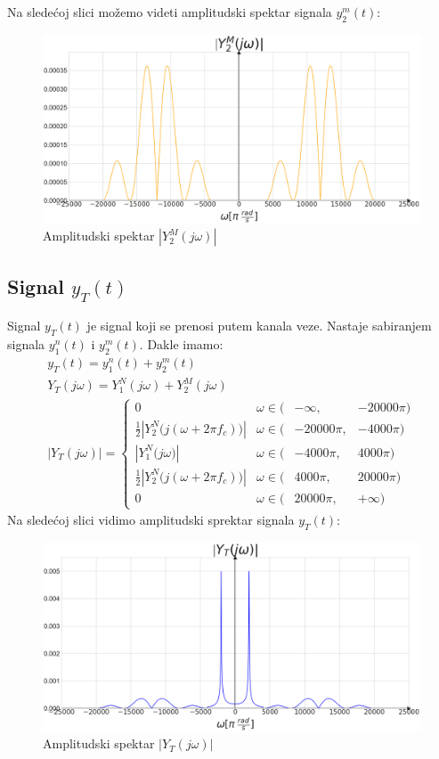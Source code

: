 \documentclass[titlepage,a4paper,12pt]{article}
\begin{document}
	\clearpage
	Na sledećoj slici možemo videti amplitudski spektar signala $y_2^m(t)$:
	\begin{figure}[ht]
		\centering
		\includegraphics[width=\textwidth]{Images/AmpY2M.png}
		\caption{Amplitudski spektar $|Y_2^M(j\omega)|$}\label{fig:AmpY2M}
	\end{figure}
	\FloatBarrier
	\clearpage
	
	\subsection{Signal $y_T(t)$}
	Signal $y_T(t)$ je signal koji se prenosi putem kanala veze. Nastaje sabiranjem signala $y_1^n(t)$ i $y_2^m(t)$. Dakle imamo:
	\begin{gather}
		y_T(t) = y_1^n(t) + y_2^m(t)\\
		Y_T(j\omega) = Y_1^N(j\omega) + Y_2^M(j\omega)\\
		|Y_T(j\omega)| = \left\{
		\begin{array}{rlrrl}
			0& \omega \in (&-\infty,& -20000\pi) \\
			\frac{1}{2}|Y_2^N\big(j(\omega+2\pi f_c)\big)|& \omega \in (&-20000\pi,& -4000\pi) \\
			|Y_1^N\big(j\omega\big)|& \omega \in (&-4000\pi,& 4000\pi) \\
			\frac{1}{2}|Y_2^N\big(j(\omega+2\pi f_c)\big)|& \omega \in (&4000\pi,& 20000\pi) \\
			0& \omega \in (&20000\pi,& +\infty)
		\end{array}\right.
	\end{gather}
	Na sledećoj slici vidimo amplitudski sprektar signala $y_T(t)$:
	\begin{figure}[ht]
		\centering
		\includegraphics[width=\textwidth]{Images/AmpYT.png}
		\caption{Amplitudski spektar $|Y_T(j\omega)|$}\label{fig:AmpYT}
	\end{figure}
	\FloatBarrier
	\clearpage
	
\end{document}
